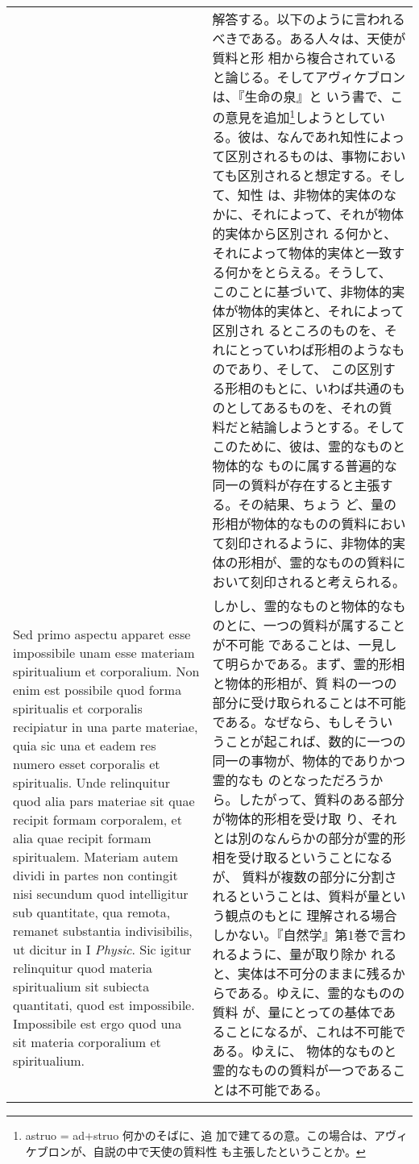 \documentclass[10pt]{jsarticle} %
\begin{document}
\begin{longtable}{p{21em}p{21em}}
 &

 解答する。以下のように言われるべきである。ある人々は、天使が質料と形
 相から複合されていると論じる。そしてアヴィケブロンは、『生命の泉』と
 いう書で、この意見を追加\footnote{astruo = ad+struo 何かのそばに、追
 加で建てるの意。この場合は、アヴィケブロンが、自説の中で天使の質料性
 も主張したということか。}しようとしている。彼は、なんであれ知性によっ
 て区別されるものは、事物においても区別されると想定する。そして、知性
 は、非物体的実体のなかに、それによって、それが物体的実体から区別され
 る何かと、それによって物体的実体と一致する何かをとらえる。そうして、
 このことに基づいて、非物体的実体が物体的実体と、それによって区別され
 るところのものを、それにとっていわば形相のようなものであり、そして、
 この区別する形相のもとに、いわば共通のものとしてあるものを、それの質
 料だと結論しようとする。そしてこのために、彼は、霊的なものと物体的な
 ものに属する普遍的な同一の質料が存在すると主張する。その結果、ちょう
 ど、量の形相が物体的なものの質料において刻印されるように、非物体的実
 体の形相が、霊的なものの質料において刻印されると考えられる。

 \\

 Sed primo aspectu apparet esse impossibile unam esse materiam
 spiritualium et corporalium. Non enim est possibile quod forma
 spiritualis et corporalis recipiatur in una parte materiae, quia sic
 una et eadem res numero esset corporalis et spiritualis. Unde
 relinquitur quod alia pars materiae sit quae recipit formam
 corporalem, et alia quae recipit formam spiritualem. Materiam autem
 dividi in partes non contingit nisi secundum quod intelligitur sub
 quantitate, qua remota, remanet substantia indivisibilis, ut dicitur
 in I {\itshape Physic}. Sic igitur relinquitur quod materia
 spiritualium sit subiecta quantitati, quod est
 impossibile. Impossibile est ergo quod una sit materia corporalium et
 spiritualium.


 &

 しかし、霊的なものと物体的なものとに、一つの質料が属することが不可能
 であることは、一見して明らかである。まず、霊的形相と物体的形相が、質
 料の一つの部分に受け取られることは不可能である。なぜなら、もしそうい
 うことが起これば、数的に一つの同一の事物が、物体的でありかつ霊的なも
 のとなっただろうから。したがって、質料のある部分が物体的形相を受け取
 り、それとは別のなんらかの部分が霊的形相を受け取るということになるが、
 質料が複数の部分に分割されるということは、質料が量という観点のもとに
 理解される場合しかない。『自然学』第1巻で言われるように、量が取り除か
 れると、実体は不可分のままに残るからである。ゆえに、霊的なものの質料
 が、量にとっての基体であることになるが、これは不可能である。ゆえに、
 物体的なものと霊的なものの質料が一つであることは不可能である。



\end{longtable}
\end{document}
